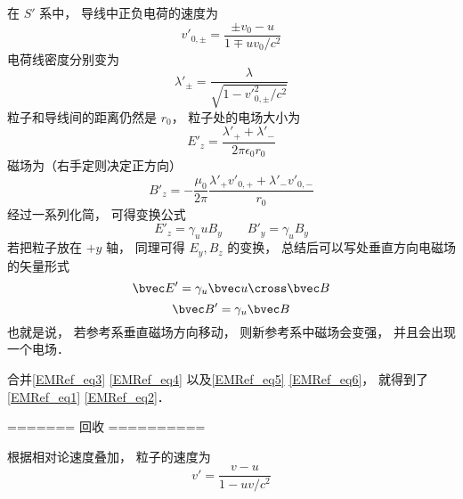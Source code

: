 在 $S'$ 系中， 导线中正负电荷的速度为
\begin{equation}
v'_{0, \pm} = \frac{\pm v_0-u}{1 \mp uv_0/c^2}
\end{equation}
电荷线密度分别变为
\begin{equation}
\lambda'_\pm = \frac{\lambda}{\sqrt{1 - v'^2_{0,\pm}/c^2}}
\end{equation}
粒子和导线间的距离仍然是 $r_0$， 粒子处的电场大小为
\begin{equation}
E'_z = \frac{\lambda'_+ + \lambda'_-}{2 \pi \epsilon_{0} r_0}
\end{equation}
磁场为（右手定则决定正方向）
\begin{equation}
B'_z = -\frac{\mu_0}{2\pi} \frac{\lambda'_+ v'_{0,+} + \lambda'_- v'_{0,-}}{r_0}
\end{equation}
经过一系列化简， 可得变换公式
\begin{equation}
E'_z = \gamma_u u B_y
\qquad
B'_y = \gamma_u B_y
\end{equation}
若把粒子放在 $+y$ 轴， 同理可得 $E_y, B_z$ 的变换， 总结后可以写处垂直方向电磁场的矢量形式
\begin{equation}\label{EMRef_eq3}
\bvec E' = \gamma_u \bvec u \cross \bvec B
\end{equation}
\begin{equation}\label{EMRef_eq4}
\bvec B' = \gamma_u \bvec B
\end{equation}
也就是说， 若参考系垂直磁场方向移动， 则新参考系中磁场会变强， 并且会出现一个电场．



合并\autoref{EMRef_eq3} \autoref{EMRef_eq4} 以及\autoref{EMRef_eq5} \autoref{EMRef_eq6}， 就得到了\autoref{EMRef_eq1} \autoref{EMRef_eq2}．

======= 回收 ==========

根据相对论速度叠加， 粒子的速度为
\begin{equation}
v' = \frac{v - u}{1 - uv/c^2}
\end{equation}
